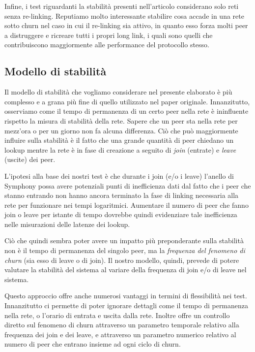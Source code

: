 \documentclass[prodmode,acmtap]{acmlarge}
\begin{document}
Infine, i test riguardanti la stabilità presenti nell'articolo considerano solo reti senza re-linking. Reputiamo molto interessante stabilire cosa accade in una rete sotto churn nel caso in cui il re-linking sia attivo, in quanto esso forza molti peer a distruggere e ricreare tutti i propri long link, i quali sono quelli che contribuiscono maggiormente alle performance del protocollo stesso.


\subsection{Modello di stabilità}

Il modello di stabilità che vogliamo considerare nel presente elaborato è più complesso e a grana più fine di quello utilizzato nel paper originale. Innanzitutto, osserviamo come il tempo di permanenza di un certo peer nella rete è ininfluente rispetto la misura di stabilità della rete. Sapere che un peer sta nella rete per mezz'ora o per un giorno non fa alcuna differenza. Ciò che può maggiormente influire sulla stabilità è il fatto che una grande quantità di peer chiedano un lookup mentre la rete è in fase di creazione a seguito di \emph{join} (entrate) e \emph{leave} (uscite) dei peer.

L'ipotesi alla base dei nostri test è che durante i join (e/o i leave) l'anello di Symphony possa avere potenziali punti di inefficienza dati dal fatto che i peer che stanno entrando non hanno ancora terminato la fase di linking necessaria alla rete per funzionare nei tempi logaritmici. Aumentare il numero di peer che fanno join o leave per istante di tempo dovrebbe quindi evidenziare tale inefficienza nelle misurazioni delle latenze dei lookup.

Ciò che quindi sembra poter avere un impatto più preponderante sulla stabilità non è il tempo di permanenza del singolo peer, ma la \emph{frequenza del fenomeno di churn} (sia esso di leave o di join). Il nostro modello, quindi, prevede di potere valutare la stabilità del sistema al variare della frequenza di join e/o di leave nel sistema.

Questo approccio offre anche numerosi vantaggi in termini di flessibilità nei test. Innanzitutto ci permette di poter ignorare dettagli come il tempo di permanenza nella rete, o l'orario di entrata e uscita dalla rete. Inoltre offre un controllo diretto sul fenomeno di churn attraverso un parametro temporale relativo alla frequenza dei join e dei leave, e attraverso un parametro numerico relativo al numero di peer che entrano insieme ad ogni ciclo di churn.
\end{document}
